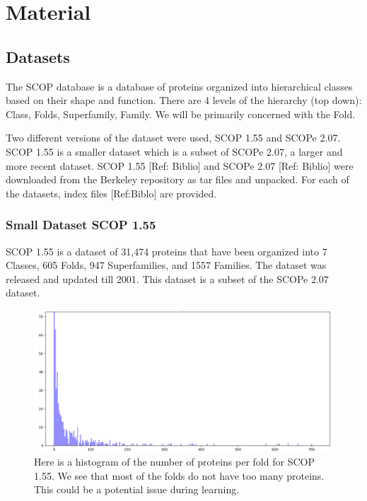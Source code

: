\documentclass[12pt, a4paper, twocolumn, fullpage]{article}
\theoremstyle{plain}
\theoremstyle{definition}
\theoremstyle{remark}
\begin{document}
\section{Material}

\subsection{Datasets}

The SCOP database is a database of proteins organized into hierarchical classes based on their shape and function. There are 4 levels of the hierarchy (top down): Class, Folds, Superfamily, Family. We will be primarily concerned with the Fold.

Two different versions of the dataset were used, SCOP 1.55 and SCOPe 2.07. SCOP 1.55 is a smaller dataset which is a subset of SCOPe 2.07, a larger and more recent dataset. SCOP 1.55 [Ref: Biblio] and SCOPe 2.07 [Ref: Biblio] were downloaded from the Berkeley repository as tar files and unpacked. For each of the datasets, index files [Ref:Biblo] are provided.

\subsubsection{Small Dataset SCOP 1.55}

SCOP 1.55 is a dataset of 31,474 proteins that have been organized into 7 Classes, 605 Folds, 947 Superfamilies, and 1557 Families. The dataset was released and updated till 2001. This dataset is a subset of the SCOPe 2.07 dataset.


\begin{figure}[t]
    \includegraphics[width=\linewidth]{num_proteins_fold_155}
    \caption{Here is a histogram of the number of proteins per fold for SCOP 1.55. We see that most of the folds do not have too many proteins. This could be a potential issue during learning.}
    \label{num_proteins_fold_155}
\end{figure}
\end{document}
